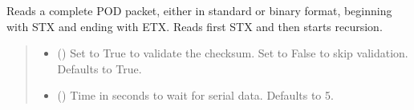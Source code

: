 \documentclass[letterpaper,10pt,english]{sphinxmanual}
\begin{document}
\begin{fulllineitems}
\begin{fulllineitems}
\begin{quote}
\begin{description}
\end{description}\end{quote}

\end{fulllineitems}


\begin{fulllineitems}
\label{\detokenize{PodApi.Devices:PodApi.Devices.BasicPodProtocol.Pod.ReadPODpacket}}
\pysigstartsignatures
{}
\pysigstopsignatures
\sphinxAtStartPar
Reads a complete POD packet, either in standard or binary format, beginning with STX and         ending with ETX. Reads first STX and then starts recursion.
\begin{quote}\begin{description}
\begin{itemize}
\item {} 
\sphinxAtStartPar
{} (\sphinxstyleliteralemphasis{\sphinxupquote{, }}) \textendash{} Set to True to validate the checksum. Set to False to                 skip validation. Defaults to True.

\item {} 
\sphinxAtStartPar
{} (\sphinxstyleliteralemphasis{\sphinxupquote{|}}\sphinxstyleliteralemphasis{\sphinxupquote{, }}) \textendash{} Time in seconds to wait for serial data.                 Defaults to 5.

\end{itemize}


\end{description}
\end{quote}
\end{fulllineitems}
\end{fulllineitems}
\end{document}
